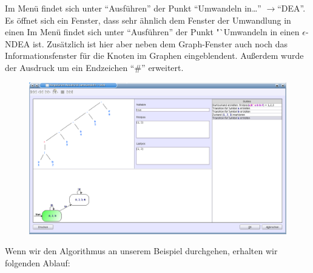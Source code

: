 Im Menü findet sich unter "`Ausführen"' der Punkt "`Umwandeln in\ldots"' $\rightarrow$"`DEA"'. Es öffnet sich ein Fenster, dass sehr ähnlich dem Fenster der Umwandlung in einen Im Menü findet sich unter "`Ausführen"' der Punkt "`Umwandeln in einen $\epsilon$-NDEA ist. Zusätzlich ist hier aber neben dem Graph-Fenster auch noch das Informationsfenster für die Knoten im Graphen eingeblendent. Außerdem wurde der Ausdruck um ein Endzeichen "`\#"' erweitert.

\begin{figure}[h]
\begin{center}
\includegraphics[width=12cm]{../images/regex_to_dfa.png}
\end{center}
\end{figure}

Wenn wir den Algorithmus an unserem Beispiel durchgehen, erhalten wir folgenden Ablauf:

